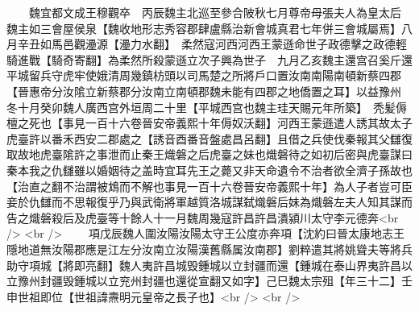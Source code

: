 　　魏宜都文成王穆觀卒　丙辰魏主北巡至參合陂秋七月尊帝母張夫人為皇太后　魏主如三會屋侯泉【魏收地形志秀容郡肆盧縣治新會城真君七年併三會城屬焉】八月辛丑如馬邑觀灅源【灅力水翻】　柔然寇河西河西王蒙遜命世子政德擊之政德輕騎進戰【騎奇寄翻】為柔然所殺蒙遜立次子興為世子　九月乙亥魏主還宫召奚斤還平城留兵守虎牢使娥清周幾鎮枋頭以司馬楚之所將戶口置汝南南陽南頓新蔡四郡【晉惠帝分汝隂立新蔡郡分汝南立南頓郡魏未能有四郡之地僑置之耳】以益豫州　冬十月癸卯魏人廣西宫外垣周二十里【平城西宫也魏主珪天賜元年所築】　秃髪傉檀之死也【事見一百十六卷晉安帝義熙十年傉奴沃翻】河西王蒙遜遣人誘其故太子虎臺許以番禾西安二郡處之【誘音酉番音盤處昌呂翻】且借之兵使伐秦報其父讎復取故地虎臺隂許之事泄而止秦王熾磐之后虎臺之妹也熾磐待之如初后密與虎臺謀曰秦本我之仇讎雖以婚姻待之盖時宜耳先王之薨又非天命遺令不治者欲全濟子孫故也【治直之翻不治謂被鴆而不解也事見一百十六卷晉安帝義熙十年】為人子者豈可臣妾於仇讎而不思報復乎乃與武衛將軍越質洛城謀弑熾磐后妹為熾磐左夫人知其謀而告之熾磐殺后及虎臺等十餘人十一月魏周幾寇許昌許昌潰潁川太守李元德奔<br />
<br />
　　項戊辰魏人圍汝陽汝陽太守王公度亦奔項【沈約曰晉太康地志王隱地道無汝陽郡應是江左分汝南立汝陽漢舊縣属汝南郡】劉粹遣其將姚聳夫等將兵助守項城【將即亮翻】魏人夷許昌城毁鍾城以立封疆而還【鍾城在泰山界夷許昌以立豫州封疆毁鍾城以立兖州封疆也還從宣翻又如字】己巳魏太宗殂【年三十二】壬申世祖即位【世祖諱燾明元皇帝之長子也】<br />
<br />
